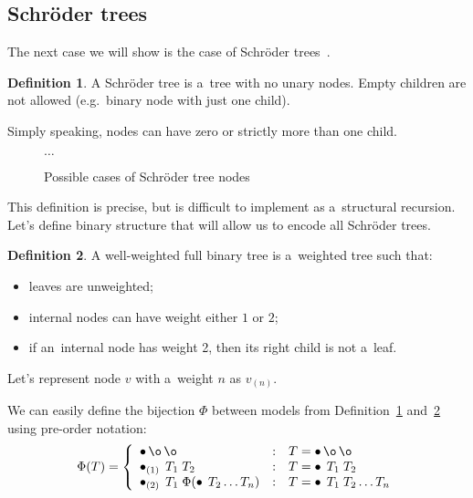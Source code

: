 \documentclass[final]{article}
\theoremstyle{definition}
\newtheorem{definition}{Definition}[subsection]
\theoremstyle{definition}
\theoremstyle{remark}
\newcommand{\weighted}[1]{\ensuremath{_{(#1)}}}
\DeclareMathOperator{\n}{\bullet}
\DeclareMathOperator{\no}{\o}
\begin{document}
\subsection{Schröder trees}%
\label{sub:schröder_trees}

The next case we will show is the case of Schröder trees~\cite{schroder}.

\begin{definition}%
    \label{def:schroder_tree}
    A Schröder tree is a~tree with no unary nodes. Empty children are not allowed (e.g.~binary node with just one child).
\end{definition}

Simply speaking, nodes can have zero or strictly more than one child.

\begin{figure}[H]
    \centering
    
    
    
    
    \(\ldots\)
    \caption{Possible cases of Schröder tree nodes}%
    \label{fig:schroder_trees}
\end{figure}

This definition is precise, but is difficult to implement as a~structural recursion. Let's define binary structure that will allow us to encode all Schröder trees.

\begin{definition}%
    \label{def:well_weighted}
    A well-weighted full binary tree is a~weighted tree such that:
    \begin{itemize}
        \item leaves are unweighted;
        \item internal nodes can have weight either \(1\) or \(2\);
        \item if an~internal node has weight 2, then its right child is not a~leaf.
    \end{itemize}
\end{definition}

Let's represent node \(v\) with a~weight \(n\) as \(v\weighted{n}\).

We can easily define the bijection \(\Phi\) between models from Definition~\ref{def:schroder_tree} and~\ref{def:well_weighted} using pre-order notation:
\[\Phi(T) = \left\{\begin{array}{lcl}
            \n \no \no &:& T = \n \no \no \\
            \n\weighted{1}\; T_1\; T_2 &:& T = \n\; T_1\; T_2\\
            \n\weighted{2}\; T_1\; \Phi(\n\; T_2 \ldots T_n) &:& T = \n\; T_1\; T_2 \ldots T_n
\end{array}\right.\]
\end{document}
